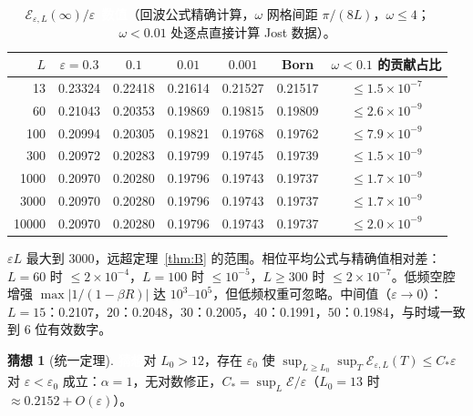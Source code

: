 \documentclass[11pt,a4paper,fontset=windows]{ctexart}
\newcommand{\tagbox}[2]{\begingroup\setlength{\fboxsep}{1.4pt}\colorbox{#1}{\textcolor{white}{\footnotesize\bfseries #2}}\endgroup}
\newcommand{\numer}{\tagbox{orange!85!black}{数值}}
\newcommand{\conj}{\tagbox{red!70!black}{猜想}}
\theoremstyle{definition}
\newtheorem{conjecture}{猜想}
\theoremstyle{definition}
\newcommand{\eps}{\varepsilon}
\newcommand{\cE}{\mathcal E}
\begin{document}
\begin{table}[h]
\centering\small
\caption{$\cE_{\eps,L}(\infty)/\eps$\ \numer（回波公式精确计算，$\omega$ 网格间距 $\pi/(8L)$，$\omega\le4$；$\omega<0.01$ 处逐点直接计算 Jost 数据）。}\label{tab:largeL}
\begin{tabular}{@{}rcccccc@{}}
\toprule
$L$ & $\eps=0.3$ & $0.1$ & $0.01$ & $0.001$ & Born & $\omega<0.1$ 的贡献占比\\\midrule
13 & 0.23324 & 0.22418 & 0.21614 & 0.21527 & 0.21517 & $\le1.5\times10^{-7}$\\
60 & 0.21043 & 0.20353 & 0.19869 & 0.19815 & 0.19809 & $\le2.6\times10^{-9}$\\
100 & 0.20994 & 0.20305 & 0.19821 & 0.19768 & 0.19762 & $\le7.9\times10^{-9}$\\
300 & 0.20972 & 0.20283 & 0.19799 & 0.19745 & 0.19739 & $\le1.5\times10^{-9}$\\
1000 & 0.20970 & 0.20280 & 0.19796 & 0.19743 & 0.19737 & $\le1.7\times10^{-9}$\\
3000 & 0.20970 & 0.20280 & 0.19796 & 0.19743 & 0.19737 & $\le1.7\times10^{-9}$\\
10000 & 0.20970 & 0.20280 & 0.19796 & 0.19743 & 0.19737 & $\le2.0\times10^{-9}$\\\bottomrule
\end{tabular}
\end{table}
$\eps L$ 最大到 3000，远超定理~\ref{thm:B} 的范围。相位平均公式与精确值相对差：$L=60$ 时 $\le2\times10^{-4}$，$L=100$ 时 $\le10^{-5}$，$L\ge300$ 时 $\le2\times10^{-7}$。低频空腔增强 $\max|1/(1-\beta R)|$ 达 $10^3$--$10^5$，但低频权重可忽略。中间值（$\eps\to0$）：$L=15$：0.2107，$20$：0.2048，$30$：0.2005，$40$：0.1991，$50$：0.1984，与时域一致到 6 位有效数字。

\begin{conjecture}[统一定理]\label{conj:C2}\conj\enspace 对 $L_0>12$，存在 $\eps_0$ 使 $\sup_{L\ge L_0}\sup_T\cE_{\eps,L}(T)\le C_*\eps$ 对 $\eps<\eps_0$ 成立：$\alpha=1$，无对数修正，$C_*=\sup_L\cE/\eps$（$L_0=13$ 时 $\approx0.2152+O(\eps)$）。
\end{conjecture}
\end{document}
